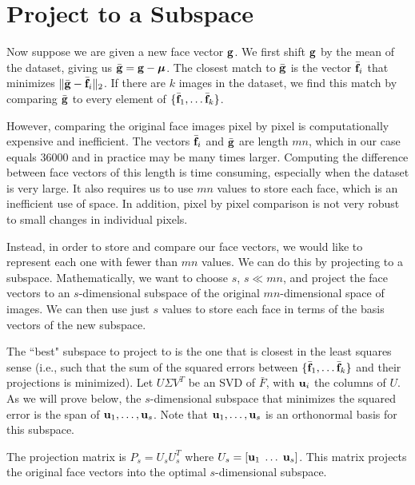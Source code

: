 \section*{Project to a Subspace} %

Now suppose we are given a new face vector $\mathbf{g}$.
We first shift $\mathbf{g}$ by the mean of the dataset, giving us $\bar{\mathbf{g}} = \mathbf{g} - {\boldsymbol \mu}$.
The closest match to $\bar{\mathbf{g}}$ is the vector $\bar{\mathbf{f}}_i$ that minimizes $\|\bar{\mathbf{g}}-\bar{\mathbf{f}}_i\|_2$.
If there are $k$ images in the dataset, we find this match by comparing $\bar{\mathbf{g}}$ to every element of $\{\bar{\mathbf{f}}_1, \ldots \bar{\mathbf{f}}_k\}$.

However, comparing the original face images pixel by pixel is computationally expensive and inefficient.
The vectors $\bar{\mathbf{f}}_i$ and $\bar{\mathbf{g}}$ are length $mn$, which in our case equals 36000 and in practice may be many times larger.
Computing the difference between face vectors of this length is time consuming, especially when the dataset is very large.
It also requires us to use $mn$ values to store each face, which is an inefficient use of space.
In addition, pixel by pixel comparison is not very robust to small changes in individual pixels.

Instead, in order to store and compare our face vectors, we would like to represent each one with fewer than $mn$ values.
We can do this by projecting to a subspace.
Mathematically, we want to choose $s$, $s \ll mn$, and project the face vectors to an $s$-dimensional subspace of the original $mn$-dimensional space of images.
We can then use just $s$ values to store each face in terms of the basis vectors of the new subspace.

The ``best" subspace to project to is the one that is closest in the least squares sense (i.e., such that the sum of the squared errors between $\{\bar{\mathbf{f}}_1, \ldots \bar{\mathbf{f}}_k\}$ and their projections is minimized).
Let $U \Sigma V^T$ be an SVD of $\bar{F}$, with $\mathbf{u}_i$ the columns of $U$.
As we will prove below, the $s$-dimensional subspace that minimizes the squared error is the span of $\mathbf{u}_1, \ldots, \mathbf{u}_s$.
Note that $\mathbf{u}_1, \ldots, \mathbf{u}_s$ is an orthonormal basis for this subspace.

The projection matrix is $P_s = U_s U_s^T$ where $U_s = [ \mathbf{u}_1\; \ldots \; \mathbf{u}_s]$.
This matrix projects the original face vectors into the optimal $s$-dimensional subspace.


